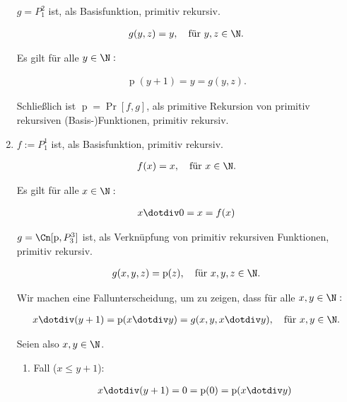 \begin{solution}
\begin{enumerate}[label = (\alph*)]
    $g = P_1^2$ ist, als Basisfunktion, primitiv rekursiv.

    \begin{align*}
        g(y, z) = y, \quad \text{für}~ y, z \in \N.
    \end{align*}

    Es gilt für alle $y \in \N:$

    \begin{align*}
        \operatorname p(y + 1) = y = g(y, z).
    \end{align*}

    Schließlich ist $\operatorname p = \Pr[f, g]$, als primitive Rekursion von primitiv rekursiven (Basis-)Funktionen, primitiv rekursiv.

    \item $f := P_1^1$ ist, als Basisfunktion, primitiv rekursiv.
    
    \begin{align*}
        f(x) = x, \quad \text{für}~ x \in \N.
    \end{align*}
    
    Es gilt für alle $x \in \N:$

    \begin{align*}
        x \dotdiv 0 = x = f(x)
    \end{align*}
    
    $g = \Cn[\operatorname p, P_3^3]$ ist, als Verknüpfung von primitiv rekursiven Funktionen, primitiv rekursiv.

    \begin{align*}
        g(x, y, z) = \operatorname p(z), \quad \text{für}~ x, y, z \in \N.
    \end{align*}

    Wir machen eine Fallunterscheidung, um zu zeigen, dass für alle $x, y \in \N:$

    \begin{align*}
        x \dotdiv (y + 1) = \operatorname p(x \dotdiv y) = g(x, y, x \dotdiv y), \quad \text{für}~ x, y \in \N.
    \end{align*}

    Seien also $x, y \in \N$.

    \begin{enumerate}[label = \arabic*.]

        \item Fall ($x \leq y + 1$):
        
        \begin{align*}
            x \dotdiv (y + 1)
            =
            0
            =
            \operatorname p(0)
            =
            \operatorname p(x \dotdiv y)
        \end{align*}


\end{enumerate}
\end{enumerate}
\end{solution}
